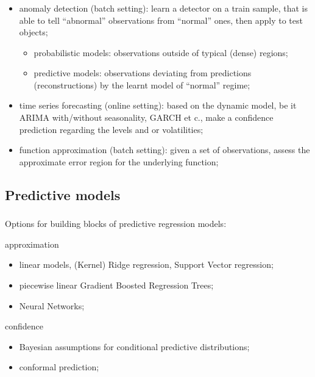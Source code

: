 \documentclass[t]{beamer}  %
\begin{document}
\begin{frame}[c]\frametitle{\insertsection}
  \framesubtitle{\insertsubsection}
  \begin{itemize}
    \item anomaly detection (batch setting): learn a detector on a train sample,
    that is able to tell ``abnormal'' observations from ``normal'' ones, then
    apply to test objects;
    \begin{itemize}
      \item probabilistic models: observations outside of typical (dense) regions;
      \item predictive models: observations deviating from predictions (reconstructions)
      by the learnt model of ``normal'' regime;
    \end{itemize}
    \item time series forecasting (online setting): based on the dynamic model, be
    it ARIMA with/without seasonality, GARCH et c., make a confidence prediction
    regarding the levels and or volatilities;
    \item function approximation (batch setting): given a set of observations,
    assess the approximate error region for the underlying function;
  \end{itemize}
\end{frame}

\subsection{Predictive models} %
\label{sub:predictive_models}

\begin{frame}[c]\frametitle{\insertsection}
  \framesubtitle{\insertsubsection}
  Options for building blocks of predictive regression models: 
  \begin{block}{approximation}
    \begin{itemize}
      \item linear models, (Kernel) Ridge regression, Support Vector regression;
      \item piecewise linear Gradient Boosted Regression Trees;
      \item Neural Networks;
    \end{itemize}
  \end{block}
  \begin{block}{confidence}
      \begin{itemize}
        \item Bayesian assumptions for conditional predictive distributions;
        \item conformal prediction;
      \end{itemize}
  \end{block}
\end{frame}
\end{document}
